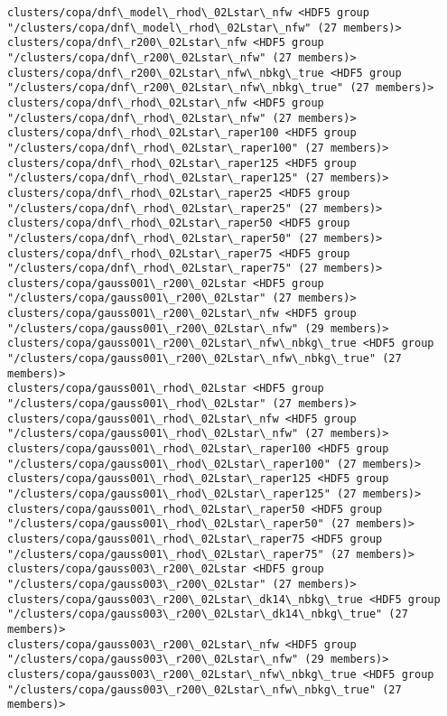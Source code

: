 \documentclass[11pt]{article}
\begin{document}
\begin{Verbatim}[commandchars=\\\{\}]
clusters/copa/dnf\_model\_rhod\_02Lstar\_nfw <HDF5 group "/clusters/copa/dnf\_model\_rhod\_02Lstar\_nfw" (27 members)>
clusters/copa/dnf\_r200\_02Lstar\_nfw <HDF5 group "/clusters/copa/dnf\_r200\_02Lstar\_nfw" (27 members)>
clusters/copa/dnf\_r200\_02Lstar\_nfw\_nbkg\_true <HDF5 group "/clusters/copa/dnf\_r200\_02Lstar\_nfw\_nbkg\_true" (27 members)>
clusters/copa/dnf\_rhod\_02Lstar\_nfw <HDF5 group "/clusters/copa/dnf\_rhod\_02Lstar\_nfw" (27 members)>
clusters/copa/dnf\_rhod\_02Lstar\_raper100 <HDF5 group "/clusters/copa/dnf\_rhod\_02Lstar\_raper100" (27 members)>
clusters/copa/dnf\_rhod\_02Lstar\_raper125 <HDF5 group "/clusters/copa/dnf\_rhod\_02Lstar\_raper125" (27 members)>
clusters/copa/dnf\_rhod\_02Lstar\_raper25 <HDF5 group "/clusters/copa/dnf\_rhod\_02Lstar\_raper25" (27 members)>
clusters/copa/dnf\_rhod\_02Lstar\_raper50 <HDF5 group "/clusters/copa/dnf\_rhod\_02Lstar\_raper50" (27 members)>
clusters/copa/dnf\_rhod\_02Lstar\_raper75 <HDF5 group "/clusters/copa/dnf\_rhod\_02Lstar\_raper75" (27 members)>
clusters/copa/gauss001\_r200\_02Lstar <HDF5 group "/clusters/copa/gauss001\_r200\_02Lstar" (27 members)>
clusters/copa/gauss001\_r200\_02Lstar\_nfw <HDF5 group "/clusters/copa/gauss001\_r200\_02Lstar\_nfw" (29 members)>
clusters/copa/gauss001\_r200\_02Lstar\_nfw\_nbkg\_true <HDF5 group "/clusters/copa/gauss001\_r200\_02Lstar\_nfw\_nbkg\_true" (27 members)>
clusters/copa/gauss001\_rhod\_02Lstar <HDF5 group "/clusters/copa/gauss001\_rhod\_02Lstar" (27 members)>
clusters/copa/gauss001\_rhod\_02Lstar\_nfw <HDF5 group "/clusters/copa/gauss001\_rhod\_02Lstar\_nfw" (27 members)>
clusters/copa/gauss001\_rhod\_02Lstar\_raper100 <HDF5 group "/clusters/copa/gauss001\_rhod\_02Lstar\_raper100" (27 members)>
clusters/copa/gauss001\_rhod\_02Lstar\_raper125 <HDF5 group "/clusters/copa/gauss001\_rhod\_02Lstar\_raper125" (27 members)>
clusters/copa/gauss001\_rhod\_02Lstar\_raper50 <HDF5 group "/clusters/copa/gauss001\_rhod\_02Lstar\_raper50" (27 members)>
clusters/copa/gauss001\_rhod\_02Lstar\_raper75 <HDF5 group "/clusters/copa/gauss001\_rhod\_02Lstar\_raper75" (27 members)>
clusters/copa/gauss003\_r200\_02Lstar <HDF5 group "/clusters/copa/gauss003\_r200\_02Lstar" (27 members)>
clusters/copa/gauss003\_r200\_02Lstar\_dk14\_nbkg\_true <HDF5 group "/clusters/copa/gauss003\_r200\_02Lstar\_dk14\_nbkg\_true" (27 members)>
clusters/copa/gauss003\_r200\_02Lstar\_nfw <HDF5 group "/clusters/copa/gauss003\_r200\_02Lstar\_nfw" (29 members)>
clusters/copa/gauss003\_r200\_02Lstar\_nfw\_nbkg\_true <HDF5 group "/clusters/copa/gauss003\_r200\_02Lstar\_nfw\_nbkg\_true" (27 members)>

\end{Verbatim}
\end{document}
